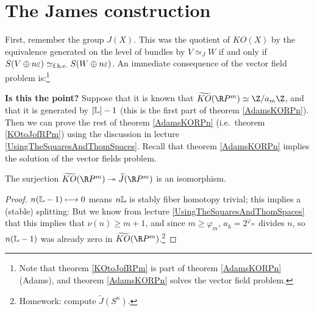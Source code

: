 

\section{The James construction} %
\label{TheJamesConstruction}
\ifx\OutputTheJamesConstruction\undefined\else
First, remember the group $J(X)$.  This was the quotient of $KO(X)$ by the equivalence generated on the level of bundles by $V \simeq_J W$ if and only if $S(V \oplus n \varepsilon) \simeq_\textup{f.h.e.} S(W \oplus n \varepsilon)$.  An immediate consequence of the vector field problem is:\footnote{Note that theorem \ref{KOtoJofRPm} is part of theorem \ref{AdamsKORPn} (Adams), and theorem \ref{AdamsKORPn} solves the vector field problem.}
\begin{ConfusedNote}
\textbf{Is this the point?}
Suppose that it is known that $\widetilde{KO}(\RP^m)\simeq\Z/a_m\Z$, and that it is generated by $[\mathbb{L}]-1$ (this is the first part of theorem \ref{AdamsKORPn}). Then we can prove the rest of theorem \ref{AdamsKORPn} (i.e.\ theorem \ref{KOtoJofRPm}) using the discussion in lecture \ref{UsingTheSquaresAndThomSpaces}. Recall that theorem \ref{AdamsKORPn} implies the solution of the vector fields problem.
\begin{thm} \label{KOtoJofRPm}
The surjection $\widetilde{KO}(\RP^m) \onto \widetilde J(\RP^m)$ is an isomorphism.
\end{thm}
\begin{proof}
$n(\mathbb{L} - 1) \longmapsto 0$ means $n \mathbb{L}$ is stably fiber homotopy trivial; this implies a (stable) splitting:
But we know from lecture \ref{UsingTheSquaresAndThomSpaces} that this implies that $\nu(n)\geq m+1$, and since $m\geq \varphi_m$, $a_k=2^{\varphi_m}$ divides $n$, so $n(\mathbb{L} - 1)$ was already zero in $\widetilde{KO}(\RP^m)$.\footnote{Homework: compute $\widetilde J(S^n)$.}
\end{proof}
\end{ConfusedNote}

